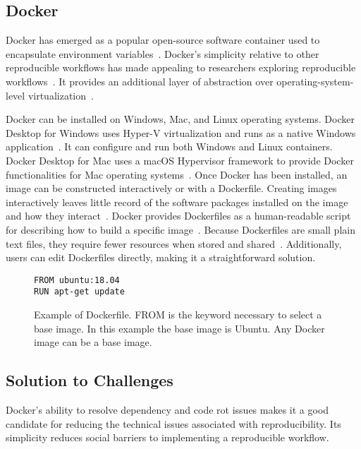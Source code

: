 \documentclass{IEEEtran}
\begin{document}
\subsection{Docker}
Docker has emerged as a popular open-source software container used to encapsulate environment variables~\cite{ITD}. Docker’s simplicity relative to other reproducible workflows has made appealing to researchers exploring reproducible workflows~\cite{ITD}. It provides an additional layer of abstraction over operating-system-level virtualization~\cite{TPC}.

Docker can be installed on Windows, Mac, and Linux operating systems. Docker Desktop for Windows uses Hyper-V virtualization and runs as a native Windows application~\cite{dockerdoc}. It can configure and run both Windows and Linux containers. Docker Desktop for Mac uses a macOS Hypervisor framework to provide Docker functionalities for Mac operating systems~\cite{dockerdoc}. Once Docker has been installed, an image can be constructed interactively or with a Dockerfile. Creating images interactively leaves little record of the software packages installed on the image and how they interact~\cite{ITD}. Docker provides Dockerfiles as a human-readable script for describing how to build a specific image~\cite{ITD}. Because Dockerfiles are small plain text files, they require fewer resources when stored and shared~\cite{ITD}. Additionally, users can edit Dockerfiles directly, making it a straightforward solution.

\begin{figure}[h]
\centering
\begin{mdframed}
\small
\begin{verbatim}
FROM ubuntu:18.04
RUN apt-get update

\end{verbatim}
\end{mdframed}
\caption{\footnotesize Example of Dockerfile. FROM is the keyword necessary to select a base image. In this example the base image is Ubuntu. Any Docker image can be a base image. }
\label{fig2}
\end{figure}

\subsection{Solution to Challenges}
Docker's ability to resolve dependency and code rot issues makes it a good candidate for reducing the technical issues associated with reproducibility. Its simplicity reduces social barriers to implementing a reproducible workflow.
\end{document}
